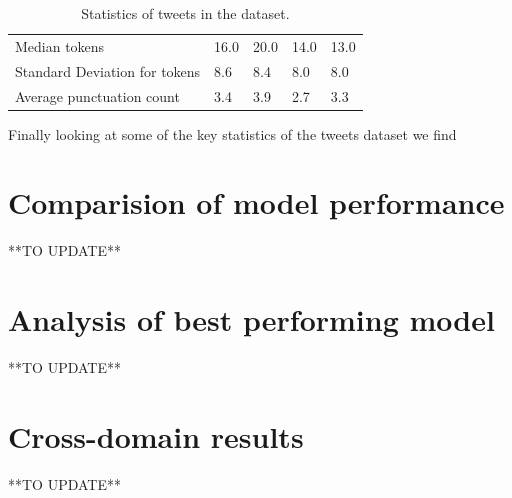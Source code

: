 \begin{table}[htbp]
\begin{tabularx}{\textwidth}{|l|X|X|X|X|}
        \rowcolor[gray]{0.9}
        Median tokens                   & 16.0                & 20.0                & 14.0                    & 13.0            \\
        Standard Deviation for tokens   & 8.6                 & 8.4                 & 8.0                     & 8.0             \\
        \hline
        \hline
        Average punctuation count       & 3.4                 & 3.9                 & 2.7                     & 3.3             \\
        \hline
    \end{tabularx}
    \caption{Statistics of tweets in the dataset.}
    \label{tab: tweets_statistics}
\end{table}

Finally looking at some of the key statistics of the tweets dataset we find 

\section{Comparision of model performance}
**TO UPDATE**

\section{Analysis of best performing model}
**TO UPDATE**

\section{Cross-domain results}
**TO UPDATE**